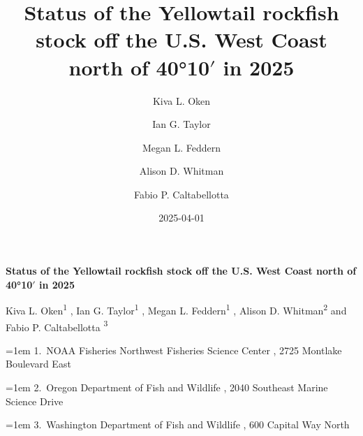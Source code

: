 \documentclass[
]{scrartcl}
\title{Status of the Yellowtail rockfish stock off the U.S. West Coast
north of 40°10\(\prime\) in 2025}
\author{Kiva L. Oken \and Ian G. Taylor \and Megan L.
Feddern \and Alison D. Whitman \and Fabio P. Caltabellotta}
\date{2025-04-01}
\begin{document}
  \begin{titlepage}

  \begin{minipage}[b][\textheight][s]{\textwidth}


  \raggedright




  {\huge\bfseries\nohyphens{Status of the Yellowtail rockfish stock off
  the U.S. West Coast north of 40°10\(\prime\) in
  2025}}\\[1\baselineskip]



  \vspace{1\baselineskip}


  \vspace{1\baselineskip}

   {\large{Kiva L. Oken}}{\textsuperscript{1}}%
  ,
   {\large{Ian G. Taylor}}{\textsuperscript{1}}%
  ,
   {\large{Megan L. Feddern}}{\textsuperscript{1}}%
  ,
   {\large{Alison D. Whitman}}{\textsuperscript{2}}%
  { and \large{Fabio P. Caltabellotta}}%
  {\textsuperscript{3}}%



  \vspace{2\baselineskip}

  \hangindent=1em
  {1}.~{NOAA Fisheries Northwest Fisheries Science Center}%
  , %
  {2725 Montlake Boulevard East}%
  \par\hangindent=1em%
  {2}.~{Oregon Department of Fish and Wildlife}%
  , %
  {2040 Southeast Marine Science Drive}%
  \par\hangindent=1em%
  {3}.~{Washington Department of Fish and Wildlife}%
  , %
  {600 Capital Way North}%



\end{minipage}
\end{titlepage}
\end{document}
